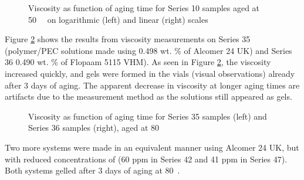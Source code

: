 \begin{figure}
    \centering
    \caption{Viscosity as function of aging time for Series 10 samples aged at 50~\celsius~ on logarithmic (left) and linear (right) scales}
    \label{cht:s10visc50}
\end{figure}

Figure \ref{cht:s3536visc} shows the results from viscosity measurements on Series 35 (polymer/PEC solutions made using 0.498 wt. \% of Alcomer 24 UK) and Series 36  0.490 wt. \% of Flopaam 5115 VHM). As seen in Figure \ref{cht:s3536visc}, the viscosity increased quickly, and gels were formed in the vials (visual observations) already after 3 days of aging. The apparent decrease in viscosity at longer aging times are artifacts due to the measurement method as the solutions still appeared as gels.

\begin{figure}
    \centering
    \caption{Viscosity as function of aging time for Series 35 samples (left) and Series 36 samples (right), aged at 80~\celsius}
    \label{cht:s3536visc}
\end{figure}

Two more systems were made in an equivalent manner using Alcomer 24 UK, but with reduced concentrations of  (60 ppm in Series 42 and 41 ppm in Series 47). Both systems gelled after 3 days of aging at 80~\celsius.

